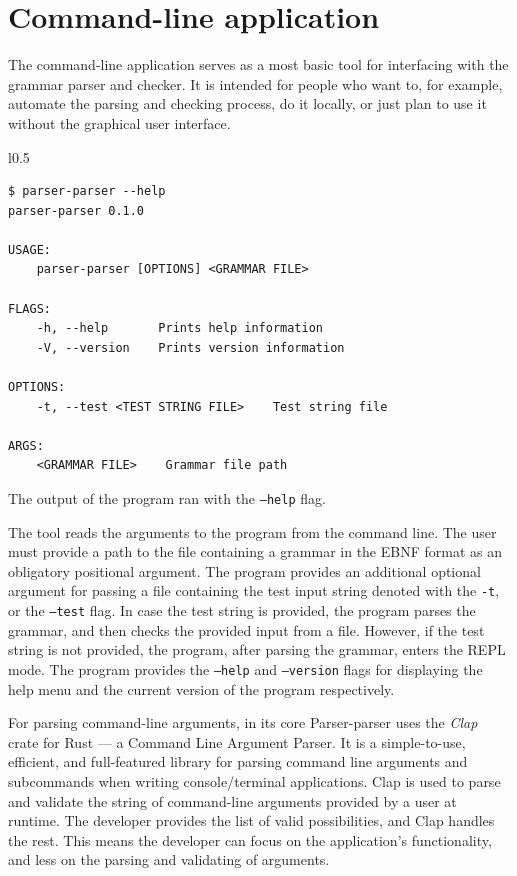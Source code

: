 \documentclass[english,engineering]{wizthesis}
\newcommand{\thisproject}{Parser-parser}
\begin{document}
\newpage

\section{Command-line application} \label{sec:command-line-application}

The command-line application serves as a most basic tool for interfacing with
the grammar parser and checker. It is intended for people who want to, for
example, automate the parsing and checking process, do it locally, or just plan
to use it without the graphical user interface.

\begin{wraplisting}{l}{0.5\textwidth}
  \begin{verbatim}
$ parser-parser --help
parser-parser 0.1.0

USAGE:
    parser-parser [OPTIONS] <GRAMMAR FILE>

FLAGS:
    -h, --help       Prints help information
    -V, --version    Prints version information

OPTIONS:
    -t, --test <TEST STRING FILE>    Test string file

ARGS:
    <GRAMMAR FILE>    Grammar file path
  \end{verbatim}
  \caption{The output of the program ran with the \texttt{--help} flag.}
  \label{lst:cli-help}
\end{wraplisting}

The tool reads the arguments to the program from the command line. The user must
provide a path to the file containing a grammar in the EBNF format as an
obligatory positional argument. The program provides an additional optional
argument for passing a file containing the test input string denoted with the
\texttt{-t}, or the \texttt{--test} flag. In case the test string is provided,
the program parses the grammar, and then checks the provided input from a file.
However, if the test string is not provided, the program, after parsing the
grammar, enters the REPL mode. The program provides the \texttt{--help} and
\texttt{--version} flags for displaying the help menu and the current version of
the program respectively.

For parsing command-line arguments, in its core \thisproject{} uses the
\emph{Clap} crate for Rust --- a Command Line Argument Parser. It is a
simple-to-use, efficient, and full-featured library for parsing command line
arguments and subcommands when writing console/terminal applications. Clap is
used to parse and validate the string of command-line arguments provided by a
user at runtime. The developer provides the list of valid possibilities, and
Clap handles the rest. This means the developer can focus on the application's
functionality, and less on the parsing and validating of arguments.
\end{document}
